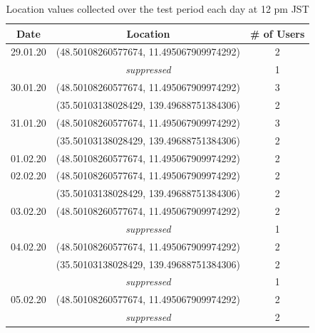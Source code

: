 \begin{table}[htbp]
    \centering
    \begin{tabular}{|c|c|c|} 
        \hline
        \textbf{Date} & \textbf{Location} & \textbf{\# of Users} \\ [0.5ex] 
        \hline
        29.01.20 & (48.50108260577674, 11.495067909974292) & 2 \\
        &\textit{suppressed} & 1 \\
        \hline
        30.01.20 & (48.50108260577674, 11.495067909974292) & 3 \\ 
        & (35.50103138028429, 139.49688751384306) & 2 \\
        \hline
        31.01.20 & (48.50108260577674, 11.495067909974292) & 3 \\ 
        & (35.50103138028429, 139.49688751384306) & 2 \\
        \hline
        01.02.20 & (48.50108260577674, 11.495067909974292) & 2 \\ 
        \hline
        02.02.20 & (48.50108260577674, 11.495067909974292) & 2 \\ 
        & (35.50103138028429, 139.49688751384306) & 2 \\
        \hline
        03.02.20 & (48.50108260577674, 11.495067909974292) & 2 \\ 
        &\textit{suppressed} & 1 \\
        \hline
        04.02.20 & (48.50108260577674, 11.495067909974292) & 2 \\ 
        & (35.50103138028429, 139.49688751384306) & 2 \\
        &\textit{suppressed} & 1 \\
        \hline
        05.02.20 & (48.50108260577674, 11.495067909974292) & 2 \\
        &\textit{suppressed} & 2 \\
        \hline
    \end{tabular}
    \caption{Location values collected over the test period each day at 12 pm JST}
    \label{tab:location_jst}
\end{table}

